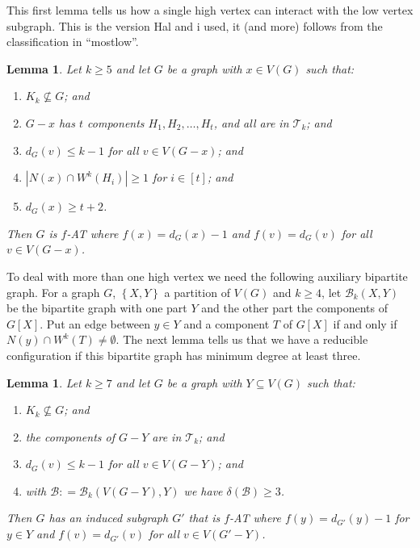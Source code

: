 \documentclass[12pt]{article}
\theoremstyle{plain}
\newtheorem{lem}[thm]{Lemma}
\theoremstyle{definition}
\theoremstyle{remark}
\newcommand{\fancy}[1]{\mathcal{#1}}
\newcommand{\T}{\fancy{T}}
\newcommand{\B}{\fancy{B}}
\newcommand{\set}[1]{\left\{ #1 \right\}}
\newcommand{\card}[1]{\left|#1\right|}
\newcommand{\irange}[1]{\left[#1\right]}
\newcommand{\DefinedAs}{\mathrel{\mathop:}=}
\begin{document}
This first lemma tells us how a single high vertex can interact with the low vertex subgraph.  This is the version Hal and i used, it (and more) follows from the classification in ``mostlow''.

\begin{lem}\label{ConfigurationTypeOneEuler}
Let $k \ge 5$ and let $G$ be a graph with $x \in V(G)$ such that:
\begin{enumerate}
\item $K_k \not \subseteq G$; and
\item $G-x$ has $t$ components $H_1, H_2, \ldots, H_t$, and all are in $\T_k$; and
\item $d_G(v) \leq k - 1$ for all $v \in V(G-x)$; and
\item $\card{N(x) \cap W^k(H_i)} \ge 1$ for $i \in \irange{t}$; and
\item $d_G(x) \ge t+2$.
\end{enumerate}

\noindent Then $G$ is $f$-AT where $f(x) = d_G(x) - 1$ and $f(v) = d_G(v)$ for all $v \in V(G - x)$.
\end{lem}

To deal with more than one high vertex we need the following auxiliary bipartite graph.  For a graph $G$, $\set{X, Y}$ a partition of $V(G)$ and $k \ge 4$, let $\B_k(X, Y)$ be the bipartite graph with one part $Y$ and the other part the components of $G[X]$.  Put an edge between $y \in Y$ and a component $T$ of $G[X]$ if and only if $N(y) \cap W^k(T) \ne \emptyset$.   The next lemma tells us that we have a reducible configuration if this bipartite graph has minimum degree at least three.  

\begin{lem}
	\label{MultipleHighConfigurationEuler} Let $k\ge7$ and let $G$ be a graph with
	$Y\subseteq V(G)$ such that: 
	\begin{enumerate}
		\item $K_{k}\not\subseteq G$; and 
		\item the components of $G-Y$ are in $\T_{k}$; and 
		\item $d_{G}(v)\leq k-1$ for all $v\in V(G-Y)$; and 
		\item with $\B\DefinedAs\B_{k}(V(G-Y),Y)$ we have $\delta(\B)\ge3$. 
	\end{enumerate}
	\noindent Then $G$ has an induced subgraph $G'$ that is $f$-AT where $f(y)=d_{G'}(y)-1$
	for $y\in Y$ and $f(v)=d_{G'}(v)$ for all $v\in V(G'-Y)$.\end{lem}
\end{document}
